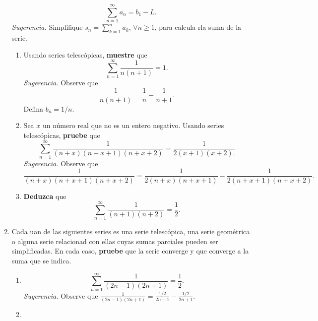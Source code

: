 \documentclass[12pt]{article}
\begin{document}
\begin{enumerate}
    \begin{equation*}
        \sum_{n=1}^{\infty}a_n=b_1-L.
    \end{equation*}
    \textit{Sugerencia.} Simplifique $s_n=\sum_{k=1}^{n}a_k$, $\forall n\geq1$, para calcula rla suma de la serie.
    \begin{enumerate}
        \item Usando series telescópicas, \textbf{muestre} que
        \begin{equation*}
            \sum_{n=1}^{\infty}\frac{1}{n(n+1)}=1.
        \end{equation*}
        \textit{Sugerencia.} Observe que
        \begin{equation*}
            \frac{1}{n(n+1)}=\frac{1}{n}-\frac{1}{n+1}.
        \end{equation*}
        Defina $b_n=1/n$.
        \item Sea $x$ un número real que no es un entero negativo. Usando series telescópicas, \textbf{pruebe} que
        \begin{equation*}
            \sum_{n=1}^{\infty}\frac{1}{(n+x)(n+x+1)(n+x+2)}=\frac{1}{2(x+1)(x+2).}
        \end{equation*}
        \textit{Sugerencia.} Observe que
        \begin{equation*}
            \frac{1}{(n+x)(n+x+1)(n+x+2)}=\frac{1}{2(n+x)(n+x+1)}-\frac{1}{2(n+x+1)(n+x+2)}.
        \end{equation*}
        \item \textbf{Deduzca} que
        \begin{equation*}
            \sum_{n=1}^{\infty}\frac{1}{(n+1)(n+2)}=\frac{1}{2}.
        \end{equation*}
    \end{enumerate}
    \item Cada uan de las siguientes series es una serie telescópica, una serie geométrica o alguna serie relacionad con ellas cuyas sumas parciales pueden ser simplificadas. En cada caso, \textbf{pruebe} que la serie converge y que converge a la suma que se indica.
    \begin{enumerate}
        \item \begin{equation*}
            \sum_{n=1}^{\infty}\frac{1}{(2n-1)(2n+1)}=\frac{1}{2}.
        \end{equation*}
        \textit{Sugerencia.} Observe que $\frac{1}{(2n-1)(2n+1)}=\frac{1/2}{2n-1}-\frac{1/2}{2n+1}$.
        \item \begin{equation*}

\end{equation*}
\end{enumerate}
\end{enumerate}
\end{document}
